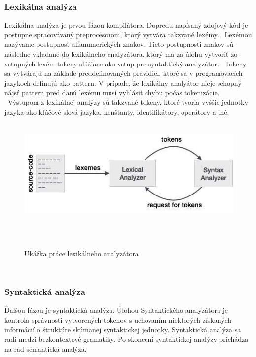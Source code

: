 \subsubsection{Lexikálna analýza}
	\indent Lexikálna analýza je prvou fázou kompilátora. Dopredu napísaný zdojový kód je postupne spracovávaný preprocesorom, ktorý vytvára takzvané lexémy. 
	 \newline Lexémou nazývame postupnosť alfanumerických znakov. Tieto postupnosti znakov sú následne vkladané do lexikálneho analyzátora, ktorý ma za úlohu vytvoriť zo vstupných lexém tokeny slúžiace ako vstup pre syntaktický analyzátor. 
	 \newline Tokeny sa vytvárajú na základe preddefinovaných pravidiel, ktoré sa v programovacích jazykoch definujú ako pattern. V prípade, že lexikálny analyátor nieje schopný nájsť  pattern pred danú lexému musí vyhlásiť chybu počas tokenizácie.  
	 \newline Výstupom z lexikálnej analýzy sú takzvané tokeny, ktoré tvoria vyššie jednotky jazyka ako kľúčové slová jazyka, konštanty, identifikátory, operátory a iné.
	 
	 \begin{figure}[!htbp]
	 	\centering
	 	\includegraphics[width=15cm]{img/lexical_analysis.jpg}
	 	\caption{Ukážka práce lexikálneho analyzátora}
	 	\label{fig:test}
	 \end{figure}
 \newline
 
\subsubsection{Syntaktická analýza}
\indent Ďalšou fázou je syntaktická analýza. Úlohou Syntaktického analyzátora je kontrola správnosti vytvorených tokenov s uchovaním niektorých získaných informácií o štruktúre skúmanej syntaktickej jednotky. Syntaktická analýza sa radí medzi bezkontextové gramatiky. Po skoncení syntaktickej analýzy prichádza na rad sémantická analýza.

